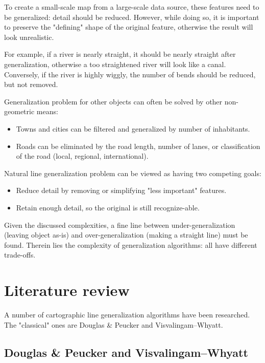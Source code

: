 \documentclass[a4paper]{article}
\newcommand{\DP}{Douglas \& Peucker}
\newcommand{\VW}{Visvalingam--Whyatt}
\begin{document}
To create a small-scale map from a large-scale data source, these features need
to be generalized: detail should be reduced. However, while doing so, it is
important to preserve the "defining" shape of the original feature, otherwise
the result will look unrealistic.

For example, if a river is nearly straight, it should be nearly straight after
generalization, otherwise a too straightened river will look like a canal.
Conversely, if the river is highly wiggly, the number of bends should be
reduced, but not removed.

Generalization problem for other objects can often be solved by other
non-geometric means:

\begin{itemize}
    \item Towns and cities can be filtered and generalized by number of
        inhabitants.
    \item Roads can be eliminated by the road length, number of lanes, or
        classification of the road (local, regional, international).
\end{itemize}

Natural line generalization problem can be viewed as having two competing
goals:

\begin{itemize}
    \item Reduce detail by removing or simplifying "less important" features.
    \item Retain enough detail, so the original is still recognize-able.
\end{itemize}

Given the discussed complexities, a fine line between under-generalization
(leaving object as-is) and over-generalization (making a straight line) must be
found. Therein lies the complexity of generalization algorithms: all have
different trade-offs.

\section{Literature review}
\label{sec:literature-review}

A number of cartographic line generalization algorithms have been researched.
The "classical" ones are {\DP} and {\VW}.

\subsection{{\DP} and {\VW}}
\end{document}
